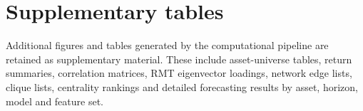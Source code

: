 \section{Supplementary tables}
\label{app:supplementary_tables}


Additional figures and tables generated by the computational pipeline are retained as supplementary material. These include asset-universe tables, return summaries, correlation matrices, RMT eigenvector loadings, network edge lists, clique lists, centrality rankings and detailed forecasting results by asset, horizon, model and feature set.

